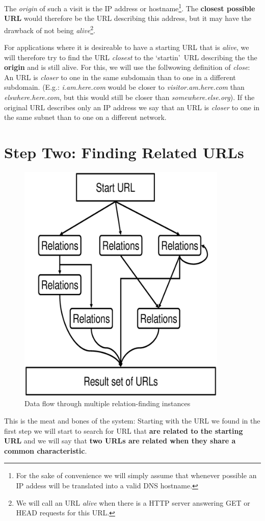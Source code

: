 \documentclass[a4paper]{danarticle}
\begin{document}
      The \textit{origin} of such a visit is the IP address or
      hostname\footnote{For the sake of convenience we will simply
      assume that whenever possible an IP addess will be translated
      into a valid DNS hostname.}. The \textbf{closest possible URL}
      would therefore be the URL describing this address, but it
      may have the drawback of not being \textit{alive}\footnote{We
      will call an URL \textit{alive} when there is a HTTP server
      answering GET or HEAD requests for this URL.}.
      
      For applications where it is desireable to have a starting
      URL that is \textit{alive}, we will therefore try to find the
      URL \textit{closest} to the \lq startin\rq\ URL describing
      the the \textbf{origin} and is still alive. For this, we 
      will use the follwowing definition of \textit{close}:
      An URL is \textit{closer} to one in the same subdomain 
      than to one in a different subdomain. (E.g.: \textit{i.am.here.com}
      would be closer to \textit{visitor.am.here.com} than
      \textit{elswhere.here.com}, but this would still be closer than
      \textit{somewhere.else.org}). If the original URL describes only
      an IP address we say that an URL is \textit{closer} to one
      in the same subnet than to one on a different network.
  \section*{Step Two: Finding Related URLs}
     \begin{figure}
       \centering
       \includegraphics[width=10cm]{relations.eps}
       \caption{Data flow through multiple relation-finding instances}
     \end{figure}
     This is the meat and bones of the system: Starting with the
     URL we found in the first step we will start to search for
     URL that \textbf{are related to the starting URL}
     and we will say that
     \textbf{two URLs are related when they share a common
     characteristic}. 
     
\end{document}

